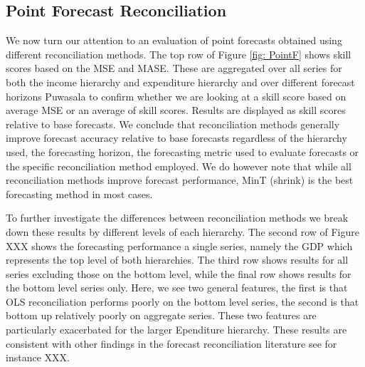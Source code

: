 \documentclass[graybox]{svmult}
\begin{document}

\subsection{Point Forecast Reconciliation}

We now turn our attention to an evaluation of point forecasts obtained using different reconciliation methods.  The top row of Figure \ref{fig: PointF} shows skill scores based on the MSE and MASE.  These are aggregated over all series for both the income hierarchy and expenditure hierarchy and over different forecast horizons {\color{red} Puwasala to confirm whether we are looking at a skill score based on average MSE or an average of skill scores}.  Results are displayed as skill scores relative to base forecasts.  We conclude that reconciliation methods generally improve forecast accuracy relative to base forecasts regardless of the hierarchy used, the forecasting horizon, the forecasting metric used to evaluate forecasts or the specific reconciliation method employed.  We do however note that while all reconciliation methods improve forecast performance, MinT (shrink) is the best forecasting method in most cases.

To further investigate the differences between reconciliation methods we break down these results by different levels of each hierarchy.  The second row of Figure XXX shows the forecasting performance a single series, namely the GDP which represents the top level of both hierarchies.  The third row shows results for all series excluding those on the bottom level, while the final row shows results for the bottom level series only.  Here, we see two general features, the first is that OLS reconciliation performs poorly on the bottom level series, the second is that bottom up relatively poorly on aggregate series.  These two features are particularly exacerbated for the larger Ependiture hierarchy.  These results are consistent with other findings in the forecast reconciliation literature see for instance XXX.
\end{document}

